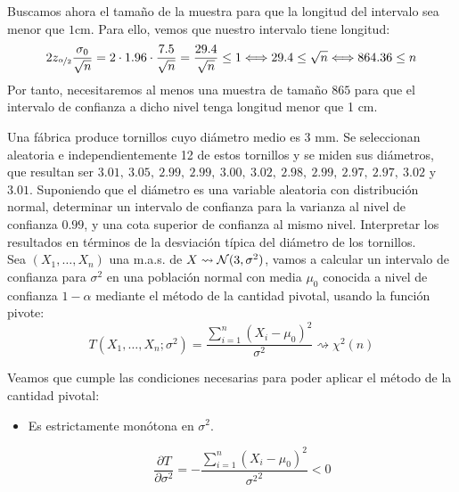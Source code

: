 \begin{ejercicio}
    Buscamos ahora el tamaño de la muestra para que la longitud del intervalo sea menor que $1$cm. Para ello, vemos que nuestro intervalo tiene longitud:
    \begin{equation*}
        2z_{\nicefrac{\alpha}{2}}\frac{\sigma_0}{\sqrt{n}} = 2\cdot 1.96 \cdot \frac{7.5}{\sqrt{n}} = \frac{29.4}{\sqrt{n}}  \leq 1 \Longleftrightarrow 29.4 \leq \sqrt{n} \Longleftrightarrow 864.36 \leq n
    \end{equation*}
    Por tanto, necesitaremos al menos una muestra de tamaño $865$ para que el intervalo de confianza a dicho nivel tenga longitud menor que 1 cm.
\end{ejercicio}

\begin{ejercicio}\label{ej:3_rel6}
    Una fábrica produce tornillos cuyo diámetro medio es $3$ mm. Se seleccionan aleatoria e independientemente 12 de estos tornillos y se miden sus diámetros, que resultan ser $3.01,\ 3.05,\ 2.99,\ 2.99,\ 3.00,\ 3.02,\ 2.98,\ 2.99,\ 2.97,\ 2.97,\ 3.02$ y $3.01$. Suponiendo que el diámetro es una variable aleatoria con distribución normal, determinar un intervalo de confianza para la varianza al nivel de confianza $0.99$, y una cota superior de confianza al mismo nivel. Interpretar los resultados en términos de la desviación típica del diámetro de los tornillos.\\


    Sea $(X_1, \ldots, X_n)$ una m.a.s. de $X\rightsquigarrow\mathcal{N}(3,\sigma^2)$, vamos a calcular un intervalo de confianza para $\sigma^2$ en una población normal con media $\mu_0$ conocida a nivel de confianza $1-\alpha$ mediante el método de la cantidad pivotal, usando la función pivote:
    \begin{equation*}
        T(X_1, \ldots, X_n;\sigma^2) = \frac{\sum\limits_{i=1}^n{(X_i-\mu_0)}^{2}}{\sigma^2} \rightsquigarrow\chi^2(n)
    \end{equation*}
    
    Veamos que cumple las condiciones necesarias para poder aplicar el método de la cantidad pivotal:
    \begin{itemize}
        \item Es estrictamente monótona en $\sigma^2$.
        
        \begin{equation*}
            \frac{\partial T}{\partial \sigma^2} = -\frac{\sum\limits_{i=1}^n{(X_i-\mu_0)}^{2}}{{\sigma^2}^2} < 0
        \end{equation*}


\end{itemize}
\end{ejercicio}
